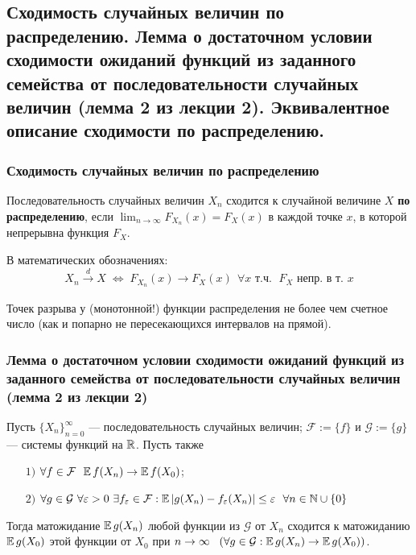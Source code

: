 \subsection{Сходимость случайных величин по распределению. Лемма о достаточном условии сходимости ожиданий функций из заданного семейства от последовательности случайных величин (лемма 2 из лекции 2). Эквивалентное описание сходимости по распределению.}

\subsubsection{Сходимость случайных величин по распределению}
\begin{definition*} Последовательность случайных величин $X_n$ сходится к случайной величине $X$ \textbf{по распределению}, если $\lim_{n \to \infty} F_{X_n}(x) = F_X(x)$ в каждой точке $x$, в которой непрерывна функция $F_X$. \end{definition*}
В математических обозначениях:
\[ X_n \xrightarrow[]{d} X \;\Leftrightarrow\; F_{X_n}(x) \to F_X(x) \ \ \forall x \text{ т.ч. } \; F_X \text{ непр. в т. } x \]

Точек разрыва у (монотонной!) функции распределения не более чем счетное число (как и попарно не пересекающихся интервалов на прямой).

\subsubsection{Лемма о достаточном условии сходимости ожиданий функций из заданного семейства от последовательности случайных величин (лемма 2 из лекции 2)}

\begin{lemma*}
    Пусть $\{X_n\}_{n=0}^{\infty}$ --- последовательность случайных величин; $\mathcal{F} := \{f\}$ и $\mathcal{G} := \{g\}$ --- системы функций на $\mathbb{R}$. Пусть также
    \begin{enumerate}
        \item[$1)$] $\forall f \in \mathcal{F} \ \ \mathbb{E}\,f(X_n) \to \mathbb{E}\,f(X_0)$;
        \item[$2)$] $\forall g \in \mathcal{G} \ \forall \varepsilon > 0 \ \exists f_{\varepsilon} \in \mathcal{F} : \mathbb{E}\,|g(X_n) - f_{\varepsilon}(X_n)| \le \varepsilon \ \ \forall n \in \mathbb{N} \cup \{0\}$
\end{enumerate}

Тогда матожидание $\mathbb{E}\,g(X_n)$ любой функции из $\mathcal{G}$ от $X_n$ сходится к матожиданию $\mathbb{E}\,g(X_0)$ этой функции от $X_0$ при $n \to \infty \ \ \left( \forall g \in \mathcal{G} : \mathbb{E}\,g(X_n) \to \mathbb{E}\,g(X_0) \right)$.
\end{lemma*}

